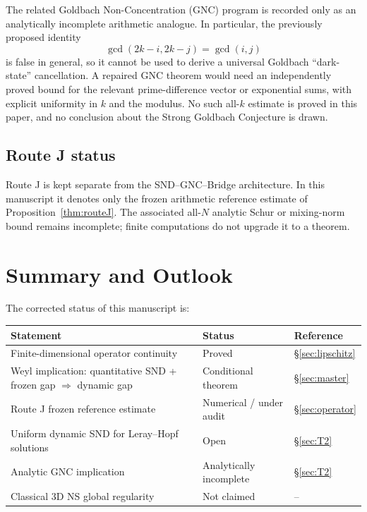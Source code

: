 \documentclass[12pt]{amsart}
\theoremstyle{definition}
\begin{document}
The related Goldbach Non-Concentration (GNC) program is recorded only as
an analytically incomplete arithmetic analogue.  In particular, the
previously proposed identity
\[
\gcd(2k-i,2k-j)=\gcd(i,j)
\]
is false in general, so it cannot be used to derive a universal
Goldbach ``dark-state'' cancellation.  A repaired GNC theorem would
need an independently proved bound for the relevant prime-difference
vector or exponential sums, with explicit uniformity in $k$ and the
modulus.  No such all-$k$ estimate is proved in this paper, and no
conclusion about the Strong Goldbach Conjecture is drawn.

\subsection{Route J status}

Route J is kept separate from the SND--GNC--Bridge architecture.  In
this manuscript it denotes only the frozen arithmetic reference estimate
of Proposition~\ref{thm:routeJ}.  The associated all-$N$ analytic Schur
or mixing-norm bound remains incomplete; finite computations do not
upgrade it to a theorem.

\section{Summary and Outlook}
\label{sec:summary}

The corrected status of this manuscript is:
\begin{center}
\renewcommand{\arraystretch}{1.35}
\begin{tabular}{p{}ll}
\toprule
\textbf{Statement} & \textbf{Status} & \textbf{Reference}\\
\midrule
Finite-dimensional operator continuity & Proved & \S\ref{sec:lipschitz}\\
Weyl implication: quantitative SND + frozen gap $\Rightarrow$ dynamic gap
  & Conditional theorem & \S\ref{sec:master}\\
Route J frozen reference estimate & Numerical / under audit & \S\ref{sec:operator}\\
Uniform dynamic SND for Leray--Hopf solutions & Open & \S\ref{sec:T2}\\
Analytic GNC implication & Analytically incomplete & \S\ref{sec:T2}\\
Classical 3D NS global regularity & Not claimed & --\\
\bottomrule
\end{tabular}
\end{center}
\end{document}
